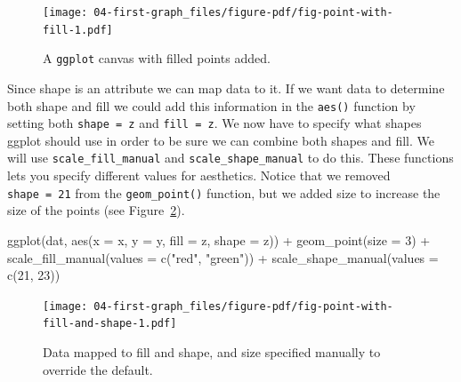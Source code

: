 \documentclass[
  11pt,
  letterpaper,
]{scrbook}
\newenvironment{Shaded}{\begin{snugshade}}{\end{snugshade}}
\newcommand{\AttributeTok}[1]{\textcolor[rgb]{0.40,0.45,0.13}{#1}}
\newcommand{\DecValTok}[1]{\textcolor[rgb]{0.68,0.00,0.00}{#1}}
\newcommand{\FunctionTok}[1]{\textcolor[rgb]{0.28,0.35,0.67}{#1}}
\newcommand{\NormalTok}[1]{\textcolor[rgb]{0.00,0.23,0.31}{#1}}
\newcommand{\SpecialCharTok}[1]{\textcolor[rgb]{0.37,0.37,0.37}{#1}}
\newcommand{\StringTok}[1]{\textcolor[rgb]{0.13,0.47,0.30}{#1}}
\begin{document}
\begin{figure}[H]

{\centering \texttt{[image: 04-first-graph\_files/figure-pdf/fig-point-with-fill-1.pdf]}

}

\caption{\label{fig-point-with-fill}A \texttt{ggplot} canvas with filled
points added.}

\end{figure}

Since shape is an attribute we can map data to it. If we want data to
determine both shape and fill we could add this information in the
\texttt{aes()} function by setting both \texttt{shape\ =\ z} and
\texttt{fill\ =\ z}. We now have to specify what shapes ggplot should
use in order to be sure we can combine both shapes and fill. We will use
\texttt{scale\_fill\_manual} and \texttt{scale\_shape\_manual} to do
this. These functions lets you specify different values for aesthetics.
Notice that we removed \texttt{shape\ =\ 21} from the
\texttt{geom\_point()} function, but we added size to increase the size
of the points (see Figure~\ref{fig-point-with-fill-and-shape}).

\begin{Shaded}
\begin{Highlighting}[numbers=left,,]
\FunctionTok{ggplot}\NormalTok{(dat, }\FunctionTok{aes}\NormalTok{(}\AttributeTok{x =}\NormalTok{ x, }\AttributeTok{y =}\NormalTok{ y, }\AttributeTok{fill =}\NormalTok{ z, }\AttributeTok{shape =}\NormalTok{ z)) }\SpecialCharTok{+} 
  \FunctionTok{geom\_point}\NormalTok{(}\AttributeTok{size =} \DecValTok{3}\NormalTok{) }\SpecialCharTok{+}
  \FunctionTok{scale\_fill\_manual}\NormalTok{(}\AttributeTok{values =} \FunctionTok{c}\NormalTok{(}\StringTok{"red"}\NormalTok{, }\StringTok{"green"}\NormalTok{)) }\SpecialCharTok{+} 
  \FunctionTok{scale\_shape\_manual}\NormalTok{(}\AttributeTok{values =} \FunctionTok{c}\NormalTok{(}\DecValTok{21}\NormalTok{, }\DecValTok{23}\NormalTok{))}
\end{Highlighting}
\end{Shaded}

\begin{figure}[H]

{\centering \texttt{[image: 04-first-graph\_files/figure-pdf/fig-point-with-fill-and-shape-1.pdf]}

}

\caption{\label{fig-point-with-fill-and-shape}Data mapped to fill and
shape, and size specified manually to override the default.}

\end{figure}
\end{document}
